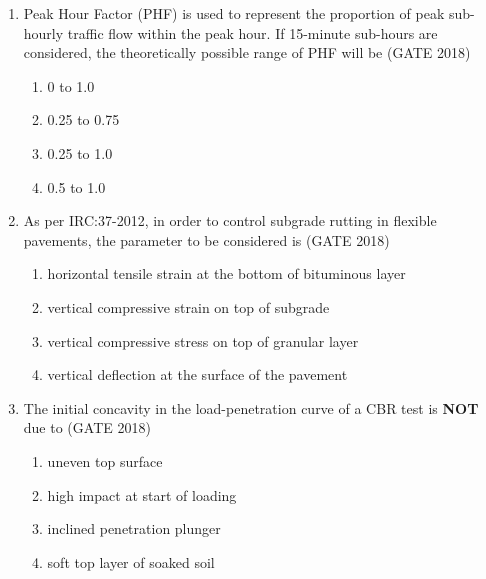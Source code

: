 \documentclass[journal,12pt,onecolumn]{IEEEtran}
\theoremstyle{remark}
\begin{document}
\begin{enumerate}
\begin{multicols}{4}
\end{multicols}
\vspace{1cm}
\newpage
\item Peak Hour Factor (PHF) is used to represent the proportion of peak sub-hourly traffic flow within the peak hour. If 15-minute sub-hours are considered, the theoretically possible range of PHF will be
\hfill{(GATE 2018)}
\begin{multicols}{4}
\begin{enumerate}
    \item 0 to 1.0
    \item 0.25 to 0.75
    \item 0.25 to 1.0
    \item 0.5 to 1.0
\end{enumerate}
\end{multicols}
\vspace{1cm}

\item As per IRC:37-2012, in order to control subgrade rutting in flexible pavements, the parameter to be considered is
\hfill{(GATE 2018)}
\begin{multicols}{4}
\begin{enumerate}
    \item horizontal tensile strain at the bottom of bituminous layer
    \item vertical compressive strain on top of subgrade
    \item vertical compressive stress on top of granular layer
    \item vertical deflection at the surface of the pavement
\end{enumerate}
\end{multicols}
\vspace{1cm}

\item The initial concavity in the load-penetration curve of a CBR test is \textbf{NOT} due to
\hfill{(GATE 2018)}

\begin{enumerate}
    \item uneven top surface
    \item high impact at start of loading
    \item inclined penetration plunger
    \item soft top layer of soaked soil
\end{enumerate}

\vspace{1cm}


\end{enumerate}
\end{document}
